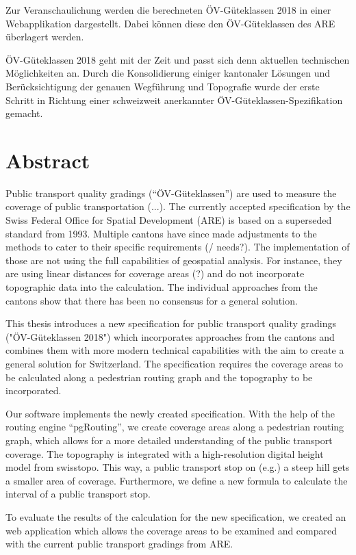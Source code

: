 Zur Veranschaulichung werden die berechneten ÖV-Güteklassen 2018 in einer
Webapplikation dargestellt.
Dabei können diese den ÖV-Güteklassen des ARE überlagert werden.

ÖV-Güteklassen 2018 geht mit der Zeit und passt sich denn aktuellen technischen Möglichkeiten an.
Durch die Konsolidierung einiger kantonaler Lösungen und Berücksichtigung der genauen Wegführung und Topografie wurde der erste Schritt in Richtung einer schweizweit anerkannter ÖV-Güteklassen-Spezifikation gemacht.

\cleardoublepage

\chapter*{Abstract}

Public transport quality gradings ("`ÖV-Güteklassen"') are used to measure the coverage of public transportation (...).
The currently accepted specification by the Swiss Federal Office for Spatial Development (ARE) is based on a superseded standard from 1993.
Multiple cantons have since made adjustments to the methods to cater to their specific requirements (/ needs?).
The implementation of those are not using the full capabilities of geospatial analysis.
For instance, they are using linear distances for coverage areas (?) and do not incorporate topographic data into the calculation.
The individual approaches from the cantons show that there has been no consensus for a general solution.

This thesis introduces a new specification for public transport quality gradings ("ÖV-Güteklassen 2018") which incorporates approaches from the cantons and combines them with more modern technical capabilities with the aim to create a general solution for Switzerland.
The specification requires the coverage areas to be calculated along a pedestrian routing graph and the topography to be incorporated.

Our software implements the newly created specification.
With the help of the routing engine "`pgRouting"', we create coverage areas along a pedestrian routing graph, which allows for a more detailed understanding of the public transport coverage.
The topography is integrated with a high-resolution digital height model from swisstopo.
This way, a public transport stop on (e.g.) a steep hill gets a smaller area of coverage.
Furthermore, we define a new formula to calculate the interval of a public transport stop.

To evaluate the results of the calculation for the new specification, we created an web application which allows the coverage areas to be examined and compared with the current public transport gradings from ARE.